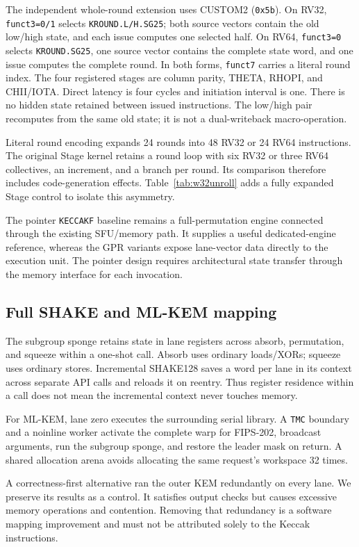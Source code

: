 \documentclass[conference,letterpaper]{IEEEtran}
\newcommand{\code}[1]{\texttt{#1}}
\begin{document}
The independent whole-round extension uses CUSTOM2 (\code{0x5b}). On RV32,
\code{funct3=0/1} selects \code{KROUND.L/H.SG25}; both source vectors contain
the old low/high state, and each issue computes one selected half. On RV64,
\code{funct3=0} selects \code{KROUND.SG25}, one source vector contains the
complete state word, and one issue computes the complete round.
In both forms, \code{funct7} carries a literal round index.
The four registered stages are column parity, THETA, RHOPI, and CHII/IOTA.
Direct latency is four cycles and initiation interval is one.
There is no hidden state retained between issued instructions.
The low/high pair recomputes from the same old state; it is not a
dual-writeback macro-operation.

Literal round encoding expands 24 rounds into 48 RV32 or 24 RV64
instructions. The original Stage kernel retains a round loop with six RV32
or three RV64 collectives, an increment, and a branch per round. Its comparison
therefore includes code-generation effects. Table~\ref{tab:w32unroll} adds a
fully expanded Stage control to isolate this asymmetry.

The pointer \code{KECCAKF} baseline remains a full-permutation engine
connected through the existing SFU/memory path. It supplies a useful
dedicated-engine reference, whereas the GPR variants expose lane-vector
data directly to the execution unit. The pointer design requires
architectural state transfer through the memory interface for each invocation.

\subsection{Full SHAKE and ML-KEM mapping}
The subgroup sponge retains state in lane registers across absorb,
permutation, and squeeze within a one-shot call. Absorb uses ordinary
loads/XORs; squeeze uses ordinary stores. Incremental SHAKE128 saves a
word per lane in its context across separate API calls and reloads it
on reentry. Thus register residence within a call does not mean the
incremental context never touches memory.

For ML-KEM, lane zero executes the surrounding serial library. A
\code{TMC} boundary and a noinline worker activate the complete warp
for FIPS-202, broadcast arguments, run the subgroup sponge, and restore
the leader mask on return. A shared allocation arena avoids allocating
the same request's workspace 32 times.

A correctness-first alternative ran the outer KEM redundantly on every
lane. We preserve its results as a control. It satisfies output checks
but causes excessive memory operations and contention.
Removing that redundancy is a software mapping improvement and must
not be attributed solely to the Keccak instructions.
\end{document}
